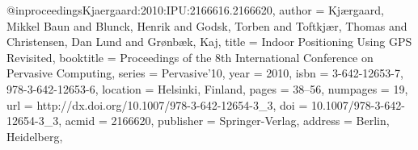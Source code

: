 @inproceedings{Kjaergaard:2010:IPU:2166616.2166620,
 author = {Kj{\ae}rgaard, Mikkel Baun and Blunck, Henrik and Godsk, Torben and Toftkj{\ae}r, Thomas and Christensen, Dan Lund and Gr{\o}nb{\ae}k, Kaj},
 title = {Indoor Positioning Using GPS Revisited},
 booktitle = {Proceedings of the 8th International Conference on Pervasive Computing},
 series = {Pervasive'10},
 year = {2010},
 isbn = {3-642-12653-7, 978-3-642-12653-6},
 location = {Helsinki, Finland},
 pages = {38--56},
 numpages = {19},
 url = {http://dx.doi.org/10.1007/978-3-642-12654-3_3},
 doi = {10.1007/978-3-642-12654-3_3},
 acmid = {2166620},
 publisher = {Springer-Verlag},
 address = {Berlin, Heidelberg},
} 
